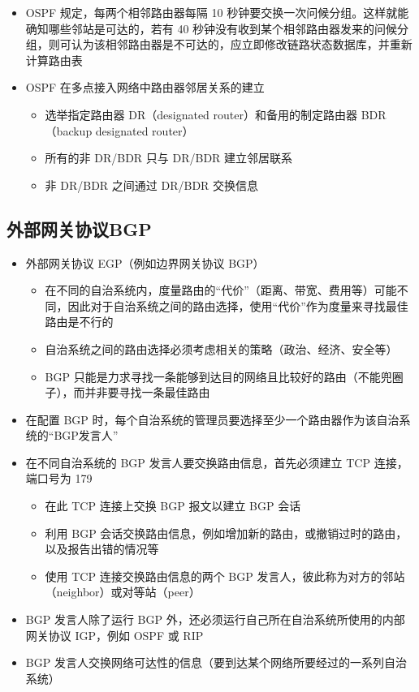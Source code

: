 \documentclass[cs4size,a4paper,10pt]{ctexart}
\begin{document}
	\begin{itemize}
		\item OSPF 规定，每两个相邻路由器每隔 10 秒钟要交换一次问候分组。这样就能确知哪些邻站是可达的，若有 40 秒钟没有收到某个相邻路由器发来的问候分组，则可认为该相邻路由器是不可达的，应立即修改链路状态数据库，并重新计算路由表
		\item OSPF 在多点接入网络中路由器邻居关系的建立
		\begin{itemize}
			\item 
			\begin{sloppypar}
			选举指定路由器 DR（designated router）和备用的制定路由器 BDR（backup designated router）	
			\end{sloppypar}
			\item 所有的非 DR/BDR 只与 DR/BDR 建立邻居联系
			\item 非 DR/BDR 之间通过 DR/BDR 交换信息
		\end{itemize}
	\end{itemize}

	\subsection{外部网关协议BGP}
	\begin{itemize}
		\item 外部网关协议 EGP（例如边界网关协议 BGP）
		\begin{itemize}
			\item 在不同的自治系统内，度量路由的“代价”（距离、带宽、费用等）可能不同，因此对于自治系统之间的路由选择，使用“代价”作为度量来寻找最佳路由是不行的
			\item 自治系统之间的路由选择必须考虑相关的策略（政治、经济、安全等）
			\item BGP 只能是力求寻找一条能够到达目的网络且比较好的路由（不能兜圈子），而并非要寻找一条最佳路由
		\end{itemize}
		\item 在配置 BGP 时，每个自治系统的管理员要选择至少一个路由器作为该自治系统的“BGP发言人”
		\item 在不同自治系统的 BGP 发言人要交换路由信息，首先必须建立 TCP 连接，端口号为 179
		\begin{itemize}
			\item 在此 TCP 连接上交换 BGP 报文以建立 BGP 会话
			\item 利用 BGP 会话交换路由信息，例如增加新的路由，或撤销过时的路由，以及报告出错的情况等
			\item 使用 TCP 连接交换路由信息的两个 BGP 发言人，彼此称为对方的邻站（neighbor）或对等站（peer）
		\end{itemize}
		\item BGP 发言人除了运行 BGP 外，还必须运行自己所在自治系统所使用的内部网关协议 IGP，例如 OSPF 或 RIP
		\item BGP 发言人交换网络可达性的信息（要到达某个网络所要经过的一系列自治系统）
	\end{itemize}
\end{document}
